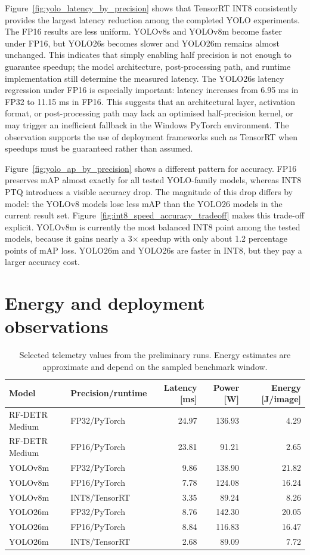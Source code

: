 \documentclass[a4paper,11pt,twoside]{report}
\theoremstyle{definition}
\begin{document}
Figure~\ref{fig:yolo_latency_by_precision} shows that TensorRT INT8 consistently provides the largest latency reduction among the completed YOLO experiments. The FP16 results are less uniform. YOLOv8s and YOLOv8m become faster under FP16, but YOLO26s becomes slower and YOLO26m remains almost unchanged. This indicates that simply enabling half precision is not enough to guarantee speedup; the model architecture, post-processing path, and runtime implementation still determine the measured latency. The YOLO26s latency regression under FP16 is especially important: latency increases from 6.95 ms in FP32 to 11.15 ms in FP16. This suggests that an architectural layer, activation format, or post-processing path may lack an optimised half-precision kernel, or may trigger an inefficient fallback in the Windows PyTorch environment. The observation supports the use of deployment frameworks such as TensorRT when speedups must be guaranteed rather than assumed.

Figure~\ref{fig:yolo_ap_by_precision} shows a different pattern for accuracy. FP16 preserves mAP almost exactly for all tested YOLO-family models, whereas INT8 PTQ introduces a visible accuracy drop. The magnitude of this drop differs by model: the YOLOv8 models lose less mAP than the YOLO26 models in the current result set. Figure~\ref{fig:int8_speed_accuracy_tradeoff} makes this trade-off explicit. YOLOv8m is currently the most balanced INT8 point among the tested models, because it gains nearly a 3$\times$ speedup with only about 1.2 percentage points of mAP loss. YOLO26m and YOLO26s are faster in INT8, but they pay a larger accuracy cost.

\section{Energy and deployment observations}

\begin{table}[H]
\centering
\small
\begin{tabular}{llrrr}
\hline
Model & Precision/runtime & Latency [ms] & Power [W] & Energy [J/image] \\
\hline
RF-DETR Medium & FP32/PyTorch & 24.97 & 136.93 & 4.29 \\
RF-DETR Medium & FP16/PyTorch & 23.81 & 91.21 & 2.65 \\
\hline
YOLOv8m & FP32/PyTorch & 9.86 & 138.90 & 21.82 \\
YOLOv8m & FP16/PyTorch & 7.78 & 124.08 & 16.24 \\
YOLOv8m & INT8/TensorRT & 3.35 & 89.24 & 8.26 \\
\hline
YOLO26m & FP32/PyTorch & 8.76 & 142.30 & 20.05 \\
YOLO26m & FP16/PyTorch & 8.84 & 116.83 & 16.47 \\
YOLO26m & INT8/TensorRT & 2.68 & 89.09 & 7.72 \\
\hline
\end{tabular}
\caption{Selected telemetry values from the preliminary runs. Energy estimates are approximate and depend on the sampled benchmark window.}
\label{tab:prelim_energy}
\end{table}
\end{document}

